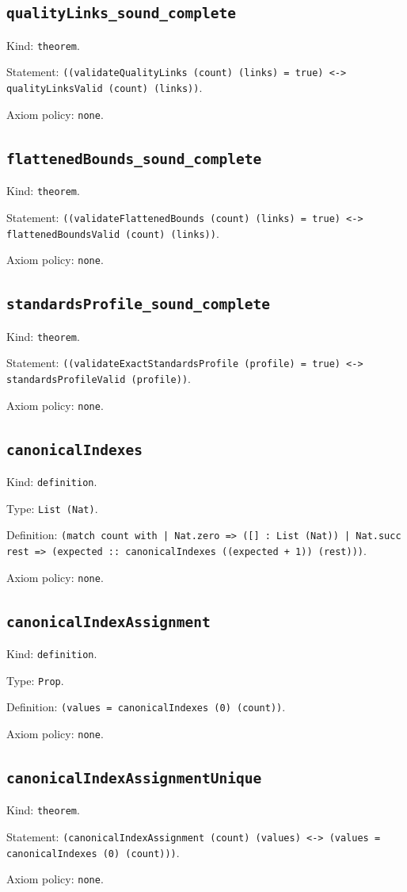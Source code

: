 \documentclass[11pt]{article}
\begin{document}
\subsection*{\texttt{qualityLinks\_sound\_complete}}
\noindent Kind: \texttt{theorem}.\par
\noindent Statement: \texttt{((validateQualityLinks (count) (links) = true) <-> qualityLinksValid (count) (links))}.\par
\noindent Axiom policy: \texttt{none}.\par
\subsection*{\texttt{flattenedBounds\_sound\_complete}}
\noindent Kind: \texttt{theorem}.\par
\noindent Statement: \texttt{((validateFlattenedBounds (count) (links) = true) <-> flattenedBoundsValid (count) (links))}.\par
\noindent Axiom policy: \texttt{none}.\par
\subsection*{\texttt{standardsProfile\_sound\_complete}}
\noindent Kind: \texttt{theorem}.\par
\noindent Statement: \texttt{((validateExactStandardsProfile (profile) = true) <-> standardsProfileValid (profile))}.\par
\noindent Axiom policy: \texttt{none}.\par
\subsection*{\texttt{canonicalIndexes}}
\noindent Kind: \texttt{definition}.\par
\noindent Type: \texttt{List (Nat)}.\par
\noindent Definition: \texttt{(match count with | Nat.zero => ([] : List (Nat)) | Nat.succ rest => (expected :: canonicalIndexes ((expected + 1)) (rest)))}.\par
\noindent Axiom policy: \texttt{none}.\par
\subsection*{\texttt{canonicalIndexAssignment}}
\noindent Kind: \texttt{definition}.\par
\noindent Type: \texttt{Prop}.\par
\noindent Definition: \texttt{(values = canonicalIndexes (0) (count))}.\par
\noindent Axiom policy: \texttt{none}.\par
\subsection*{\texttt{canonicalIndexAssignmentUnique}}
\noindent Kind: \texttt{theorem}.\par
\noindent Statement: \texttt{(canonicalIndexAssignment (count) (values) <-> (values = canonicalIndexes (0) (count)))}.\par
\noindent Axiom policy: \texttt{none}.\par
\end{document}
